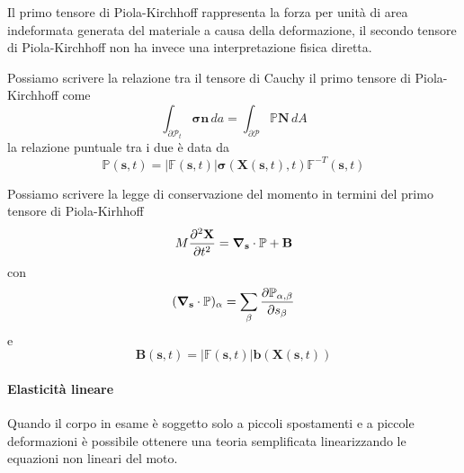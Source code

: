 Il primo tensore di Piola-Kirchhoff rappresenta la forza per unità di area indeformata generata del materiale a causa della deformazione, il secondo tensore di Piola-Kirchhoff non ha invece una interpretazione fisica diretta.

Possiamo scrivere la relazione tra il tensore di Cauchy il primo tensore di Piola-Kirchhoff come
\begin{equation*}
\int_{\partial\mathcal{P}_t} \boldsymbol{\sigma}\mathbf{n} \, da = \int_{\partial\mathcal{P}} \mathbb{P}\mathbf{N} \, dA
\end{equation*}
la relazione puntuale tra i due è data da
\begin{equation*}
\mathbb{P}(\mathbf{s},t) = \vert \mathbb{F}(\mathbf{s},t) \vert \mathbf{\sigma}(\mathbf{X}(\mathbf{s},t),t) \mathbb{F}^{-T}(\mathbf{s},t)
\end{equation*}

Possiamo scrivere la legge di conservazione del momento in termini del primo tensore di Piola-Kirhhoff
\begin{equation*}
M\frac{\partial^2\mathbf{X}}{\partial t^2} = \boldsymbol{\nabla}_\mathbf{s} \cdot \mathbb{P} + \mathbf{B}
\end{equation*}
con 
\begin{equation*}
(\boldsymbol{\nabla}_\mathbf{s} \cdot \mathbb{P} )_{\alpha} = \sum_{\beta}\frac{\partial\mathbb{P}_{\alpha,\beta}}{\partial s_\beta}
\end{equation*}
e
\begin{equation*}
\mathbf{B}(\mathbf{s},t)=\vert\mathbb{F}(\mathbf{s},t)\vert\mathbf{b}(\mathbf{X}(\mathbf{s},t))
\end{equation*}
%

\paragraph{Elasticità lineare}
Quando il corpo in esame è soggetto solo a piccoli spostamenti e a piccole deformazioni è possibile ottenere una teoria semplificata linearizzando le equazioni non lineari del moto.

